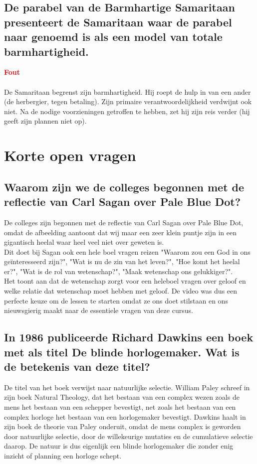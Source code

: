 \documentclass[11pt,a4paper,titlepage]{article}
\begin{document}
\subsection{De parabel van de Barmhartige Samaritaan presenteert de Samaritaan waar de parabel naar genoemd is als een model van totale barmhartigheid.}
\textcolor{red}{\textbf{Fout}}\\\\
De Samaritaan begrenst zijn barmhartigheid. Hij roept de hulp in van een ander (de herbergier, tegen betaling). Zijn primaire verantwoordelijkheid verdwijnt ook niet. Na de nodige voorzieningen getroffen te hebben, zet hij zijn reis verder (hij geeft zijn plannen niet op).

\section{Korte open vragen}

\subsection{Waarom zijn we de colleges begonnen met de reflectie van Carl Sagan over Pale Blue Dot?}
De colleges zijn begonnen met de reflectie van Carl Sagan over Pale Blue Dot, omdat de afbeelding aantoont dat wij maar een zeer klein puntje zijn in een gigantisch heelal waar heel veel niet over geweten is.\\ Dit doet bij Sagan ook een hele boel vragen reizen "Waarom zou een God in ons geïnteresseerd zijn?", "Wat is nu de zin van het leven?", "Hoe komt het heelal er?", "Wat is de rol van wetenschap?", "Maak wetenschap ons gelukkiger?".\\ Het toont aan dat de wetenschap zorgt voor een heleboel vragen over geloof en welke relatie dat wetenschap moet hebben met geloof. De video was dus een perfecte keuze om de lessen te starten omdat ze ons doet stilstaan en ons nieuwsgierig maakt naar de essentiele vragen van deze cursus.

\subsection{In 1986 publiceerde Richard Dawkins een boek met als titel De blinde horlogemaker. Wat is de betekenis van deze titel?}
De titel van het boek verwijst naar natuurlijke selectie.  William Paley schreef in zijn boek Natural Theology, dat het bestaan van een complex wezen zoals de mens het bestaan van een schepper bevestigt, net zoals het bestaan van een complex horloge het bestaan van een horlogemaker bevestigt. Dawkins haalt in zijn boek de theorie van Paley onderuit, omdat de mens complex is geworden door natuurlijke selectie, door de willekeurige mutaties en de cumulatieve selectie daarop. De natuur is dus eigenlijk een blinde horlogemaker die zonder enig inzicht of planning een horloge schept.
\end{document}
